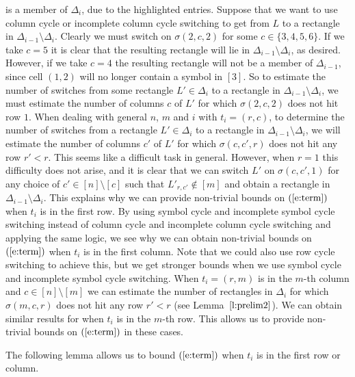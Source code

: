 \documentclass[12pt]{article}
\theoremstyle{definition}
\numberwithin{equation}{section}
\def\eref#1{$(\ref{#1})$}
\def\lref#1{Lemma~$\ref{#1}$}
\begin{document}
	is a member of $\Delta_i$, due to the highlighted entries. Suppose that we want to use column cycle or incomplete column cycle switching to get from $L$ to a rectangle in $\Delta_{i-1} \setminus \Delta_i$. Clearly we must switch on $\sigma(2, c, 2)$ for some $c \in \{3, 4, 5, 6\}$. If we take $c=5$ it is clear that the resulting rectangle will lie in $\Delta_{i-1} \setminus \Delta_i$, as desired. However, if we take $c=4$ the resulting rectangle will not be a member of $\Delta_{i-1}$, since cell $(1, 2)$ will no longer contain a symbol in $[3]$. So to estimate the number of switches from some rectangle $L' \in \Delta_i$ to a rectangle in $\Delta_{i-1} \setminus \Delta_i$, we must estimate the number of columns $c$ of $L'$ for which $\sigma(2, c, 2)$ does not hit row $1$. When dealing with general $n$, $m$ and $i$ with $t_i = (r, c)$, to determine the number of switches from a rectangle $L' \in \Delta_i$ to a rectangle in $\Delta_{i-1} \setminus \Delta_i$, we will estimate the number of columns $c'$ of $L'$ for which $\sigma(c,c',r)$ does not hit any row $r'<r$. This seems like a difficult task in general. However, when $r=1$ this difficulty does not arise, and it is clear that we can switch $L'$ on $\sigma(c, c', 1)$ for any choice of $c' \in [n] \setminus [c]$ such that $L'_{r, c'} \notin [m]$ and obtain a rectangle in $\Delta_{i-1} \setminus \Delta_i$. This explains why we can provide non-trivial bounds on \eref{e:term} when $t_i$ is in the first row. By using symbol cycle and incomplete symbol cycle switching instead of column cycle and incomplete column cycle switching and applying the same logic, we see why we can obtain non-trivial bounds on \eref{e:term} when $t_i$ is in the first column. Note that we could also use row cycle switching to achieve this, but we get stronger bounds when we use symbol cycle and incomplete symbol cycle switching. 
	When $t_i = (r, m)$ is in the $m$-th column and $c \in [n] \setminus [m]$ we can estimate the number of rectangles in $\Delta_i$ for which $\sigma(m, c, r)$ does not hit any row $r' < r$ (see \lref{l:prelim2}). We can obtain similar results for when $t_i$ is in the $m$-th row. This allows us to provide non-trivial bounds on \eref{e:term} in these cases.
	
	\medskip
	
	The following lemma allows us to bound \eref{e:term} when $t_i$ is in
	the first row or column.
	
\end{document}
